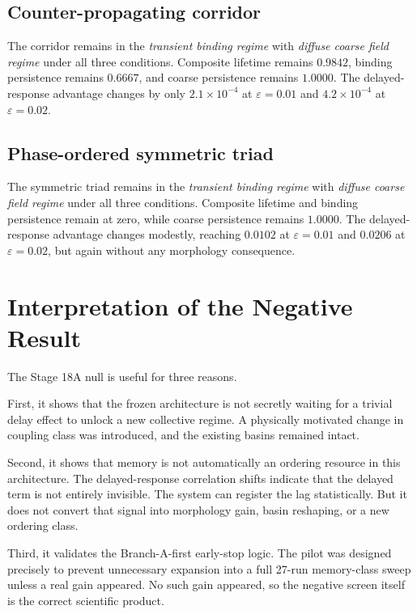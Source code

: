 \documentclass[11pt]{article}
\begin{document}
\subsection{Counter-propagating corridor}

The corridor remains in the \emph{transient binding regime} with \emph{diffuse coarse field regime} under all three conditions. Composite lifetime remains $0.9842$, binding persistence remains $0.6667$, and coarse persistence remains $1.0000$. The delayed-response advantage changes by only $2.1\times 10^{-4}$ at $\varepsilon=0.01$ and $4.2\times 10^{-4}$ at $\varepsilon=0.02$.

\subsection{Phase-ordered symmetric triad}

The symmetric triad remains in the \emph{transient binding regime} with \emph{diffuse coarse field regime} under all three conditions. Composite lifetime and binding persistence remain at zero, while coarse persistence remains $1.0000$. The delayed-response advantage changes modestly, reaching $0.0102$ at $\varepsilon=0.01$ and $0.0206$ at $\varepsilon=0.02$, but again without any morphology consequence.

\section{Interpretation of the Negative Result}

The Stage 18A null is useful for three reasons.

First, it shows that the frozen architecture is not secretly waiting for a trivial delay effect to unlock a new collective regime. A physically motivated change in coupling class was introduced, and the existing basins remained intact.

Second, it shows that memory is not automatically an ordering resource in this architecture. The delayed-response correlation shifts indicate that the delayed term is not entirely invisible. The system can register the lag statistically. But it does not convert that signal into morphology gain, basin reshaping, or a new ordering class.

Third, it validates the Branch-A-first early-stop logic. The pilot was designed precisely to prevent unnecessary expansion into a full 27-run memory-class sweep unless a real gain appeared. No such gain appeared, so the negative screen itself is the correct scientific product.
\end{document}

